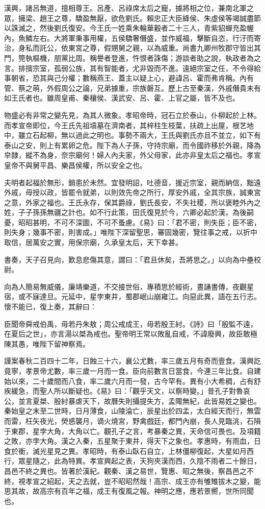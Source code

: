 \begin{pinyinscope}
漢興，諸呂無道，擅相尊王。呂產、呂祿席太后之寵，據將相之位，兼南北軍之眾，擁梁、趙王之尊，驕盈無厭，欲危劉氏。賴忠正大臣絳侯、朱虛侯等竭誠盡節以誅滅之，然後劉氏復安。今王氏一姓乘朱輪華轂者二十三人，青紫貂蟬充盈幄內，魚鱗左右。大將軍秉事用權，五侯驕奢僭盛，並作威福，擊斷自恣，行汙而寄治，身私而託公，依東宮之尊，假甥舅之親，以為威重。尚書九卿州牧郡守皆出其門，筦執樞機，朋黨比周。稱譽者登進，忤恨者誅傷；游談者助之說，執政者為之言。排擯宗室，孤弱公族，其有智能者，尤非毀而不進。遠絕宗室之任，不令得給事朝省，恐其與己分權；數稱燕王、蓋主以疑上心，避諱呂、霍而弗肯稱。內有管、蔡之萌，外假周公之論，兄弟據重，宗族磐互。歷上古至秦漢，外戚僭貴未有如王氏者也。雖周皇甫、秦穰侯、漢武安、呂、霍、上官之屬，皆不及也。

物盛必有非常之變先見，為其人微象。孝昭帝時，冠石立於泰山，仆柳起於上林。而孝宣帝即位，今王氏先祖墳墓在濟南者，其梓柱生枝葉，扶疏上出屋，根艺地中，雖立石起柳，無以過此之明也。事勢不兩大，王氏與劉氏亦且不並立，如下有泰山之安，則上有累卵之危。陛下為人子孫，守持宗廟，而令國祚移於外親，降為皁隸，縱不為身，奈宗廟何！婦人內夫家，外父母家，此亦非皇太后之福也。孝宣皇帝不與舅平昌、樂昌侯權，所以安全之也。

夫明者起福於無形，銷患於未然。宜發明詔，吐德音，援近宗室，親而納信，黜遠外戚，毋授以政，皆罷令就弟，以則效先帝之所行，厚安外戚，全其宗族，誠東宮之意，外家之福也。王氏永存，保其爵祿，劉氏長安，不失社稷，所以褒睦外內之姓，子子孫孫無疆之計也。如不行此策，田氏復見於今，六卿必起於漢，為後嗣憂，昭昭甚明，不可不深圖，不可不蚤慮。《易》曰：「君不密，則失臣；臣不密，則失身；幾事不密，則害成。」唯陛下深留聖思，審固幾密，覽往事之戒，以折中取信，居萬安之實，用保宗廟，久承皇太后，天下幸甚。

書奏，天子召見向，歎息悲傷其意，謂曰：「君且休矣，吾將思之。」以向為中壘校尉。

向為人簡易無威儀，廉靖樂道，不交接世俗，專積思於經術，晝誦書傳，夜觀星宿，或不寐達旦。元延中，星孛東井，蜀郡岷山崩雍江。向惡此異，語在五行志。懷不能已，復上奏，其辭曰：

臣聞帝舜戒伯禹，毋若丹朱敖；周公戒成王，毋若殷王紂。《詩》曰「殷監不遠，在夏后之世」，亦言湯以桀為戒也。聖帝明王常以敗亂自戒，不諱廢興，故臣敢極陳其愚，唯陛下留神察焉。

謹案春秋二百四十二年，日蝕三十六，襄公尤數，率三歲五月有奇而壹食。漢興訖竟寧，孝景帝尤數，率三歲一月而一食。臣向前數言日當食，今連三年比食。自建始以來，二十歲間而八食，率二歲六月而一發，古今罕有。異有小大希稠，占有舒疾緩急，而聖人所以斷疑也。《易》曰：「觀乎天文，以察時變。」昔孔子對魯哀公，並言夏桀、殷紂暴虐天下，故曆失則攝提失方，孟陬無紀，此皆易姓之變也。秦始皇之末至二世時，日月薄食，山陵淪亡，辰星出於四孟，太白經天而行，無雲而雷，枉矢夜光，熒惑襲月，谪火燒宮，野禽戲廷，都門內崩，長人見臨洮，石隕于東郡，星孛大角，大角以亡。觀孔子之言，考暴秦之異，天命信可畏也。及項籍之敗，亦孛大角。漢之入秦，五星聚于東井，得天下之象也。孝惠時，有雨血，日食於衝，滅光星見之異。孝昭時，有泰山臥石自立，上林僵柳復起，大星如月西行，眾星隨之，此為特異。孝宣興起之表，天狗夾漢而西，久陰不雨者二十餘日，昌邑不終之異也。皆著於漢紀。觀秦、漢之易世，覽惠、昭之無後，察昌邑之不終，視孝宣之紹起，天之去就，豈不昭昭然哉！高宗、成王亦有雊雉拔木之變，能思其故，故高宗有百年之福，成王有復風之報。神明之應，應若景嚮，世所同聞也。


\end{pinyinscope}
